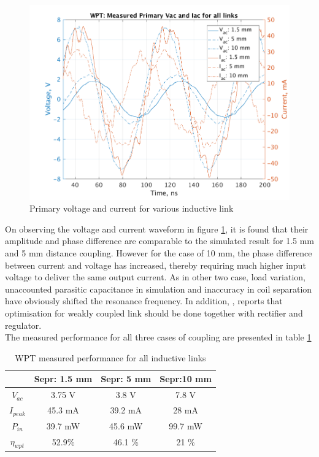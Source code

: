 \documentclass[12pt,a4paper,UKenglish]{report}
\begin{document}
 \begin{figure} [!htbp]
  \centering
  \includegraphics[width=\textwidth]{img/meas/wpt_all_pri_VI.pdf} 
 \caption{Primary voltage and current for various inductive link} 
\label{fig:meas_wpt_all_pri} 
\end{figure}

On observing the voltage and current waveform in figure \ref{fig:meas_wpt_all_pri}, it is found that their amplitude and phase difference are comparable to the simulated result for 1.5 mm and 5 mm distance coupling. However for the case of 10 mm, the phase difference between current and voltage has increased, thereby requiring much higher input voltage to deliver the same output current. As in other two case, load variation, unaccounted parasitic capacitance in simulation and inaccuracy in coil separation have obviously shifted the resonance frequency. In addition, \cite{koen_robert_2009}, reports that optimisation for weakly coupled link should be done together with rectifier and regulator. \\

The measured performance for all three cases of coupling are presented in table \ref{tab:wpt_spec_all_meas}
 
 \begin{table}[H]
\caption{WPT measured performance for all inductive links} 
\begin{center}
\begin{tabular}{c|c|c|c}
\hline \hline
				& \textbf{Sepr: 1.5 mm}	& \textbf{Sepr: 5 mm} 	& \textbf{Sepr:10 mm} \\ \hline \hline
$V_{ac}$			& 3.75 \si{\volt}			& 3.8 \si{\volt} 			& 7.8 \si{\volt}	\\ \hline
$I_{peak}$		& 45.3 \si{\milli\ampere}		& 39.2 \si{\milli\ampere} 	& 28 \si{\milli\ampere} \\ \hline
$P_{in}$			& 39.7 \si{\milli\watt}		& 45.6 \si{\milli\watt} 		& 99.7 \si{\milli\watt} \\ \hline
$\eta_{wpt}$		&  52.9\%				& 46.1 \%				& 21 \% \\ 
 
\hline \hline
\end{tabular}
\end{center}
\label{tab:wpt_spec_all_meas}
\end{table}%
\end{document}
